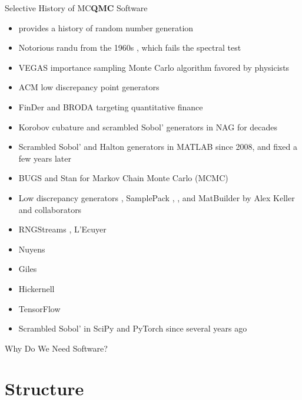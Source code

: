 \documentclass[11pt,compress,xcolor={usenames,dvipsnames},aspectratio=169]{beamer}
\begin{document}
\begin{frame}[allowframebreaks]{Selective History of MC\textbf{QMC} Software}
\vspace{-2ex}
	\begin{itemize}
		\item \textcite{LEc2017a} provides a history of \alert{random number generation}
		\item Notorious \alert{randu} from the 1960s \parencite{RANDU}, which fails the spectral test
		\item \alert{VEGAS} \parencite{Lep78a, Lep21a} importance sampling Monte Carlo algorithm favored by physicists
		\item \alert{ACM} low discrepancy point generators \parencite{BraFox88,BraFoxNie92,HonHic00a}
		\item \alert{FinDer} \parencite{PasTra95,FinDer} and \alert{BRODA} \parencite{BRODA20a} targeting quantitative finance
		\item Korobov cubature and scrambled Sobol' generators in \alert{NAG} \parencite{NAG27} for decades		
		\item Scrambled Sobol' and Halton generators in \alert{MATLAB} \parencite{MAT9.13} since 2008, and fixed a few years later
		\item \alert{BUGS} \parencite{BUGSBook, BUGSweb} and \alert{Stan} \parencite{STAN} for Markov Chain Monte Carlo (MCMC)
		\item Low discrepancy generators \parencite{FriKel02,FriKelweb}, \alert{SamplePack} \parencite{SamplePack}, \textcite{GruWeb},  and \alert{MatBuilder} \parencite{paulin2022} by Alex Keller and collaborators
		\item \alert{RNGStreams} \parencite{LEcEtal02a},  L'Ecuyer
		\item Nuyens
		\item Giles
		\item Hickernell
		\item \alert{TensorFlow}
		\item Scrambled Sobol' in \alert{SciPy} \parencite{virtanen2020scipy} and \alert{PyTorch} \parencite{paszke2019pytorch} since several years ago
		
		
	\end{itemize}
\end{frame}

\begin{frame}{Why Do We Need Software?}
\end{frame}

\section{Structure}
\end{document}
